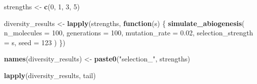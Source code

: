 \documentclass[
  oneside,
  openany]{book}
\newenvironment{Shaded}{\begin{snugshade}}{\end{snugshade}}
\newcommand{\AttributeTok}[1]{\textcolor[rgb]{0.13,0.29,0.53}{#1}}
\newcommand{\ControlFlowTok}[1]{\textcolor[rgb]{0.13,0.29,0.53}{\textbf{#1}}}
\newcommand{\DecValTok}[1]{\textcolor[rgb]{0.00,0.00,0.81}{#1}}
\newcommand{\FloatTok}[1]{\textcolor[rgb]{0.00,0.00,0.81}{#1}}
\newcommand{\FunctionTok}[1]{\textcolor[rgb]{0.13,0.29,0.53}{\textbf{#1}}}
\newcommand{\NormalTok}[1]{#1}
\newcommand{\OtherTok}[1]{\textcolor[rgb]{0.56,0.35,0.01}{#1}}
\newcommand{\StringTok}[1]{\textcolor[rgb]{0.31,0.60,0.02}{#1}}
\begin{document}
\begin{Shaded}
\begin{Highlighting}[]
\NormalTok{strengths }\OtherTok{\textless{}{-}} \FunctionTok{c}\NormalTok{(}\DecValTok{0}\NormalTok{, }\DecValTok{1}\NormalTok{, }\DecValTok{3}\NormalTok{, }\DecValTok{5}\NormalTok{)}

\NormalTok{diversity\_results }\OtherTok{\textless{}{-}} \FunctionTok{lapply}\NormalTok{(strengths, }\ControlFlowTok{function}\NormalTok{(s) \{}
  \FunctionTok{simulate\_abiogenesis}\NormalTok{(}
    \AttributeTok{n\_molecules =} \DecValTok{100}\NormalTok{,}
    \AttributeTok{generations =} \DecValTok{100}\NormalTok{,}
    \AttributeTok{mutation\_rate =} \FloatTok{0.02}\NormalTok{,}
    \AttributeTok{selection\_strength =}\NormalTok{ s,}
    \AttributeTok{seed =} \DecValTok{123}
\NormalTok{  )}
\NormalTok{\})}

\FunctionTok{names}\NormalTok{(diversity\_results) }\OtherTok{\textless{}{-}} \FunctionTok{paste0}\NormalTok{(}\StringTok{"selection\_"}\NormalTok{, strengths)}

\FunctionTok{lapply}\NormalTok{(diversity\_results, tail)}
\end{Highlighting}
\end{Shaded}
\end{document}
